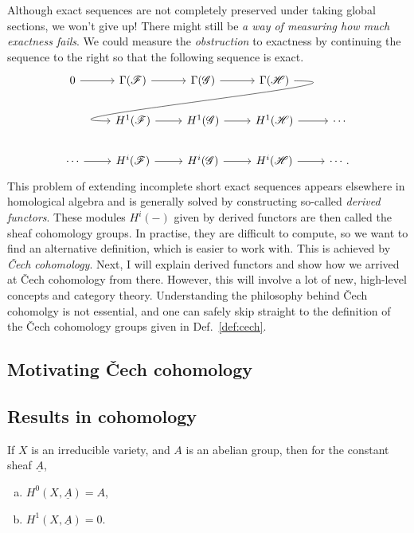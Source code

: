 \documentclass[12pt]{article}
\begin{document}
Although exact sequences are not completely preserved under taking
global sections, we won't give up! There might still be \emph{a way of
measuring how much exactness fails}. We could measure the
\emph{obstruction} to exactness by continuing the sequence to the right
so that the following sequence is exact.
\[
\begin{tikzcd}
  0 \arrow{r} & \Gamma(\mathscr{F}) \arrow{r} & \Gamma(\mathscr{G})
  \arrow{r} & \Gamma(\mathscr{H})
  \arrow[out=0, in=180, looseness=1.5, overlay]{dll} & \\
    & H^{1}(\mathscr{F}) \arrow{r} & H^{1}(\mathscr{G})
  \arrow{r} & H^{1}(\mathscr{H}) \arrow{r} & \cdots \\
  \cdots \arrow{r}& H^{i}(\mathscr{F}) \arrow{r} & H^{i}(\mathscr{G})
  \arrow{r} & H^{i}(\mathscr{H}) \arrow{r} & \cdots.
\end{tikzcd}
\]
This problem of extending incomplete short exact sequences appears
elsewhere in homological algebra and is generally solved by constructing
so-called \emph{derived functors}. These modules $H^{i}(-)$ given by derived
functors are then called the sheaf cohomology groups. In practise, they are
difficult to compute, so we want to find an alternative definition,
which is easier to work with. This is achieved by \emph{\v Cech cohomology}.
Next, I will explain derived functors and show how we arrived at \v Cech
cohomology from there. However, this will involve a lot of new, high-level
concepts and category theory. Understanding the philosophy behind
\v Cech cohomolgy is not essential, and one can safely skip straight to the
definition of the \v Cech cohomology groups given in Def.~\ref{def:cech}.

\subsection{Motivating \v Cech cohomology}


\subsection{Results in cohomology}

\begin{prop}\label{prop:const_sheaf}
  If $X$ is an irreducible variety, and $A$ is an abelian group,
  then for the constant sheaf $\underline{A}$,
  \begin{enumerate}[(a)]
    \item $H^{0}(X,\underline{A}) = A$,
    \item $H^{1}(X,\underline{A})=0$.
  \end{enumerate}
\end{prop}
\end{document}
